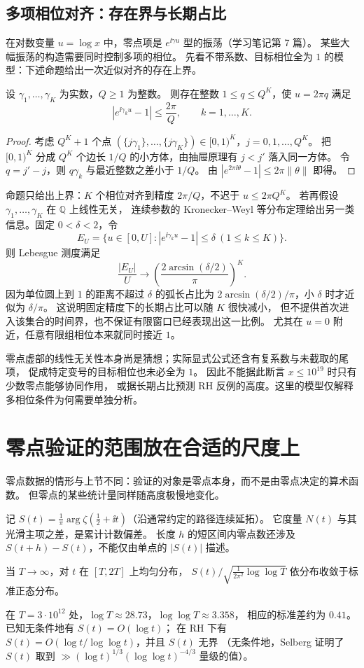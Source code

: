 \documentclass[11pt]{article}
\begin{document}
\subsection{多项相位对齐：存在界与长期占比}
在对数变量 $u=\log x$ 中，零点项是 $e^{\ii\gamma u}$ 型的振荡（学习笔记第 7 篇）。
某些大幅振荡的构造需要同时控制多项的相位。
先看不带系数、目标相位全为 $1$ 的模型：下述命题给出一次近似对齐的存在上界。
\begin{proposition}\label{prop:dirichlet}
设 $\gamma_1,\ldots,\gamma_K$ 为实数，$Q\ge1$ 为整数。
则存在整数 $1\le q\le Q^K$，使 $u=2\pi q$ 满足
\[
 |e^{\ii\gamma_ku}-1|\le\frac{2\pi}{Q},\qquad k=1,\ldots,K .
\]
\end{proposition}
\begin{proof}
考虑 $Q^K+1$ 个点 $(\{j\gamma_1\},\ldots,\{j\gamma_K\})\in[0,1)^K$，$j=0,1,\ldots,Q^K$。
把 $[0,1)^K$ 分成 $Q^K$ 个边长 $1/Q$ 的小方体，由抽屉原理有 $j<j'$ 落入同一方体。
令 $q=j'-j$，则 $q\gamma_k$ 与最近整数之差小于 $1/Q$。
由 $|e^{2\pi\ii\theta}-1|\le2\pi\|\theta\|$ 即得。
\end{proof}
命题只给出上界：$K$ 个相位对齐到精度 $2\pi/Q$，不迟于 $u\le2\pi Q^K$。
若再假设 $\gamma_1,\ldots,\gamma_K$ 在 $\mathbb Q$ 上线性无关，
连续参数的 Kronecker--Weyl 等分布定理给出另一类信息。固定 $0<\delta<2$，令
\[
 E_U=\{u\in[0,U]: |e^{\ii\gamma_ku}-1|\le\delta\ (1\le k\le K)\}.
\]
则 Lebesgue 测度满足
\[
 \frac{|E_U|}{U}\longrightarrow
 \left(\frac{2\arcsin(\delta/2)}\pi\right)^K.
\]
因为单位圆上到 $1$ 的距离不超过 $\delta$ 的弧长占比为
$2\arcsin(\delta/2)/\pi$，小 $\delta$ 时才近似为 $\delta/\pi$。
这说明固定精度下的长期占比可以随 $K$ 很快减小，
但不提供首次进入该集合的时间界，也不保证有限窗口已经表现出这一比例。
尤其在 $u=0$ 附近，任意有限组相位本来就同时接近 $1$。

零点虚部的线性无关性本身尚是猜想；实际显式公式还含有复系数与未截取的尾项，
促成特定变号的目标相位也未必全为 $1$。
因此不能据此断言 $x\le10^{19}$ 时只有少数零点能够协同作用，
或据长期占比预测 RH 反例的高度。这里的模型仅解释多相位条件为何需要单独分析。

\section{零点验证的范围放在合适的尺度上}
零点数据的情形与上节不同：验证的对象是零点本身，而不是由零点决定的算术函数。
但零点的某些统计量同样随高度极慢地变化。

记 $S(t)=\frac1\pi\arg\zeta(\tfrac12+\ii t)$（沿通常约定的路径连续延拓）。
它度量 $N(t)$ 与其光滑主项之差，是累计计数偏差。
长度 $h$ 的短区间内零点数还涉及 $S(t+h)-S(t)$，不能仅由单点的 $|S(t)|$ 描述。
\begin{theorem}
当 $T\to\infty$，对 $t$ 在 $[T,2T]$ 上均匀分布，
$S(t)\big/\sqrt{\tfrac1{2\pi^2}\log\log T}$ 依分布收敛于标准正态分布。
\end{theorem}
在 $T=3\cdot10^{12}$ 处，$\log T\approx28.73$，$\log\log T\approx3.358$，
相应的标准差约为 $0.41$。已知无条件地有 $S(t)=O(\log t)$；
在 RH 下有 $S(t)=O(\log t/\log\log t)$，并且 $S(t)$ 无界
（无条件地，Selberg 证明了 $S(t)$ 取到 $\gg(\log t)^{1/3}(\log\log t)^{-4/3}$ 量级的值）。
\end{document}
